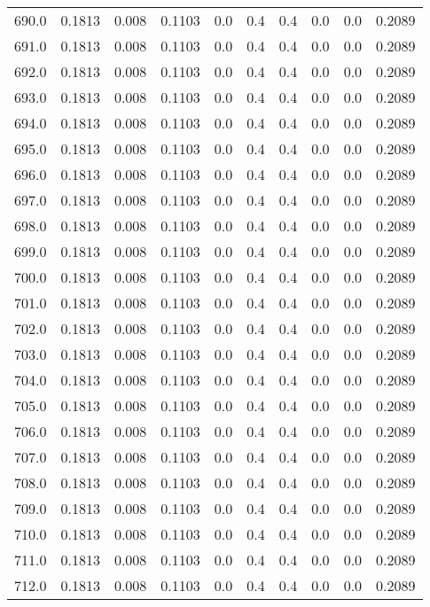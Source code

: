 \begin{longtable}{lrrrrrrrrr}
690.0 & 0.1813 & 0.008 & 0.1103 & 0.0 & 0.4 & 0.4 & 0.0 & 0.0 & 0.2089 \\
691.0 & 0.1813 & 0.008 & 0.1103 & 0.0 & 0.4 & 0.4 & 0.0 & 0.0 & 0.2089 \\
692.0 & 0.1813 & 0.008 & 0.1103 & 0.0 & 0.4 & 0.4 & 0.0 & 0.0 & 0.2089 \\
693.0 & 0.1813 & 0.008 & 0.1103 & 0.0 & 0.4 & 0.4 & 0.0 & 0.0 & 0.2089 \\
694.0 & 0.1813 & 0.008 & 0.1103 & 0.0 & 0.4 & 0.4 & 0.0 & 0.0 & 0.2089 \\
695.0 & 0.1813 & 0.008 & 0.1103 & 0.0 & 0.4 & 0.4 & 0.0 & 0.0 & 0.2089 \\
696.0 & 0.1813 & 0.008 & 0.1103 & 0.0 & 0.4 & 0.4 & 0.0 & 0.0 & 0.2089 \\
697.0 & 0.1813 & 0.008 & 0.1103 & 0.0 & 0.4 & 0.4 & 0.0 & 0.0 & 0.2089 \\
698.0 & 0.1813 & 0.008 & 0.1103 & 0.0 & 0.4 & 0.4 & 0.0 & 0.0 & 0.2089 \\
699.0 & 0.1813 & 0.008 & 0.1103 & 0.0 & 0.4 & 0.4 & 0.0 & 0.0 & 0.2089 \\
700.0 & 0.1813 & 0.008 & 0.1103 & 0.0 & 0.4 & 0.4 & 0.0 & 0.0 & 0.2089 \\
701.0 & 0.1813 & 0.008 & 0.1103 & 0.0 & 0.4 & 0.4 & 0.0 & 0.0 & 0.2089 \\
702.0 & 0.1813 & 0.008 & 0.1103 & 0.0 & 0.4 & 0.4 & 0.0 & 0.0 & 0.2089 \\
703.0 & 0.1813 & 0.008 & 0.1103 & 0.0 & 0.4 & 0.4 & 0.0 & 0.0 & 0.2089 \\
704.0 & 0.1813 & 0.008 & 0.1103 & 0.0 & 0.4 & 0.4 & 0.0 & 0.0 & 0.2089 \\
705.0 & 0.1813 & 0.008 & 0.1103 & 0.0 & 0.4 & 0.4 & 0.0 & 0.0 & 0.2089 \\
706.0 & 0.1813 & 0.008 & 0.1103 & 0.0 & 0.4 & 0.4 & 0.0 & 0.0 & 0.2089 \\
707.0 & 0.1813 & 0.008 & 0.1103 & 0.0 & 0.4 & 0.4 & 0.0 & 0.0 & 0.2089 \\
708.0 & 0.1813 & 0.008 & 0.1103 & 0.0 & 0.4 & 0.4 & 0.0 & 0.0 & 0.2089 \\
709.0 & 0.1813 & 0.008 & 0.1103 & 0.0 & 0.4 & 0.4 & 0.0 & 0.0 & 0.2089 \\
710.0 & 0.1813 & 0.008 & 0.1103 & 0.0 & 0.4 & 0.4 & 0.0 & 0.0 & 0.2089 \\
711.0 & 0.1813 & 0.008 & 0.1103 & 0.0 & 0.4 & 0.4 & 0.0 & 0.0 & 0.2089 \\
712.0 & 0.1813 & 0.008 & 0.1103 & 0.0 & 0.4 & 0.4 & 0.0 & 0.0 & 0.2089 \\

\end{longtable}
